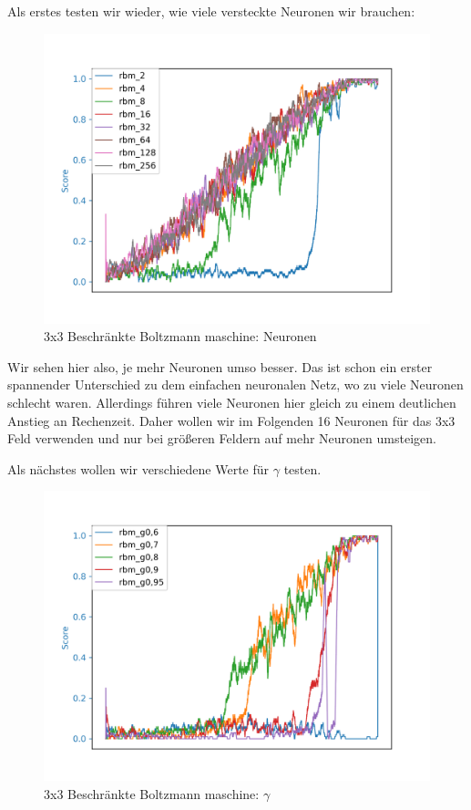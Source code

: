 Als erstes testen wir wieder, wie viele versteckte Neuronen wir brauchen:

\begin{figure}[H]
\centering
\includegraphics[width=\textwidth]{Figures/rbm6_3x3_rbm_2_rbm_4_rbm_8_rbm_16_rbm_32_rbm_64_rbm_128_rbm_256.png}
\caption{3x3 Beschränkte Boltzmann maschine: Neuronen}
\label{rbm1}
\end{figure}

Wir sehen hier also, je mehr Neuronen umso besser. Das ist schon ein erster spannender Unterschied zu dem einfachen neuronalen Netz, wo zu viele Neuronen schlecht waren. Allerdings führen viele Neuronen hier gleich zu einem deutlichen Anstieg an Rechenzeit. Daher wollen wir im Folgenden 16 Neuronen für das 3x3 Feld verwenden und nur bei größeren Feldern auf mehr Neuronen umsteigen.

Als nächstes wollen wir verschiedene Werte für $\gamma$ testen.

\begin{figure}[H]
\centering
\includegraphics[width=\textwidth]{Figures/rbm3_3x3_rbm_g0,6_rbm_g0,7_rbm_g0,8_rbm_g0,9_rbm_g0,95.png}
\caption{3x3 Beschränkte Boltzmann maschine: $\gamma$}
\label{rbm2}
\end{figure}

